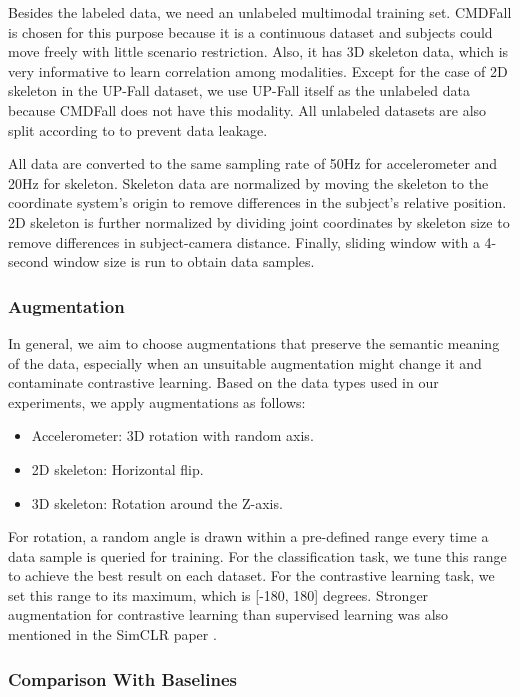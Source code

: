 \documentclass[conference]{IEEEtran}
\begin{document}
Besides the labeled data, we need an unlabeled multimodal training set. CMDFall is chosen for this purpose because it is a continuous dataset and subjects could move freely with little scenario restriction. Also, it has 3D skeleton data, which is very informative to learn correlation among modalities. Except for the case of 2D skeleton in the UP-Fall dataset, we use UP-Fall itself as the unlabeled data because CMDFall does not have this modality. All unlabeled datasets are also split according to  to prevent data leakage.

All data are converted to the same sampling rate of 50Hz for accelerometer and 20Hz for skeleton. Skeleton data are normalized by moving the skeleton to the coordinate system's origin to remove differences in the subject's relative position. 2D skeleton is further normalized by dividing joint coordinates by skeleton size to remove differences in subject-camera distance. Finally, sliding window with a 4-second window size is run to obtain data samples.

\subsubsection{Augmentation}
In general, we aim to choose augmentations that preserve the semantic meaning of the data, especially when an unsuitable augmentation might change it and contaminate contrastive learning. Based on the data types used in our experiments, we apply augmentations as follows:
\begin{itemize}
    \item Accelerometer: 3D rotation with random axis.
    \item 2D skeleton: Horizontal flip.
    \item 3D skeleton: Rotation around the Z-axis.
\end{itemize}
For rotation, a random angle is drawn within a pre-defined range every time a data sample is queried for training. For the classification task, we tune this range to achieve the best result on each dataset. For the contrastive learning task, we set this range to its maximum, which is [-180, 180] degrees. Stronger augmentation for contrastive learning than supervised learning was also mentioned in the SimCLR paper \cite{Chen2020}.

\subsubsection{Comparison With Baselines}
\label{subsec: exp baseline}
\end{document}
